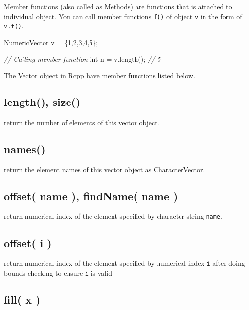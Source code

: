 \documentclass[]{book}
\newenvironment{Shaded}{\begin{snugshade}}{\end{snugshade}}
\newcommand{\CommentTok}[1]{\textcolor[rgb]{0.56,0.35,0.01}{\textit{#1}}}
\newcommand{\DataTypeTok}[1]{\textcolor[rgb]{0.13,0.29,0.53}{#1}}
\newcommand{\DecValTok}[1]{\textcolor[rgb]{0.00,0.00,0.81}{#1}}
\newcommand{\NormalTok}[1]{#1}
\begin{document}
Member functions (also called as Methods) are functions that is attached to individual object. You can call member functions \texttt{f()} of object \texttt{v} in the form of \texttt{v.f()}.

\begin{Shaded}
\begin{Highlighting}[]
\NormalTok{NumericVector v = \{}\DecValTok{1}\NormalTok{,}\DecValTok{2}\NormalTok{,}\DecValTok{3}\NormalTok{,}\DecValTok{4}\NormalTok{,}\DecValTok{5}\NormalTok{\};}

\CommentTok{// Calling member function}
\DataTypeTok{int}\NormalTok{ n = v.length(); }\CommentTok{// 5}
\end{Highlighting}
\end{Shaded}

The Vector object in Rcpp have member functions listed below.

\hypertarget{length-size}{%
\subsection{length(), size()}\label{length-size}}

return the number of elements of this vector object.

\hypertarget{names}{%
\subsection{names()}\label{names}}

return the element names of this vector object as CharacterVector.

\hypertarget{offset-name-findname-name}{%
\subsection{offset( name ), findName( name )}\label{offset-name-findname-name}}

return numerical index of the element specified by character string \texttt{name}.

\hypertarget{offset-i}{%
\subsection{offset( i )}\label{offset-i}}

return numerical index of the element specified by numerical index \texttt{i} after doing bounds checking to ensure \texttt{i} is valid.

\hypertarget{fill-x}{%
\subsection{fill( x )}\label{fill-x}}
\end{document}
